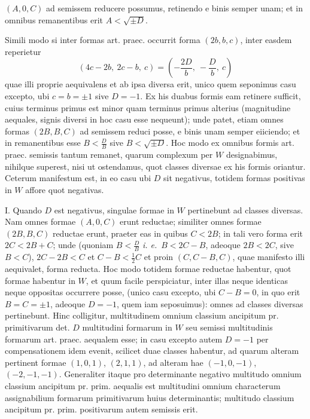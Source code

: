 $(A,0,C)$ ad semissem reducere possumus, retinendo e binis semper unam; et in
omnibus remanentibus erit $A<\sqrt{\pm D}$.

Simili modo si inter formas art. praec. occurrit forma $(2b,b,c)$, inter easdem reperietur
\[
(4c-2b,\ 2c-b,\ c)=\left(-\frac{2D}{b},\ -\frac{D}{b},\ c\right)
\]
quae illi proprie aequivalens et ab ipsa diversa erit, unico quem seponimus casu
excepto, ubi $c=b=\pm1$ sive $D=-1$. Ex his duabus formis eam retinere
sufficit, cuius terminus primus est minor quam terminus primus alterius (magnitudine
aequales, signis diversi in hoc casu esse nequeunt); unde patet, etiam
omnes formas $(2B,B,C)$ ad semissem reduci posse, e binis unam semper eiiciendo;
et in remanentibus esse $B<\frac{D}{B}$ sive $B<\sqrt{\pm D}$. Hoc modo ex omnibus
formis art. praec. semissis tantum remanet, quarum complexum per $W$ designabimus,
nihilque superest, nisi ut ostendamus, quot classes diversae ex his
formis oriantur. Ceterum manifestum est, in eo casu ubi $D$ sit negativus, totidem
formas positivas in $W$ affore quot negativas.

I. Quando $D$ est negativus, singulae formae in $W$ pertinebunt ad classes
diversas. Nam omnes formae $(A,0,C)$ erunt reductae; similiter omnes formae
$(2B,B,C)$ reductae erunt, praeter eas in quibus $C<2B$; in tali vero forma
erit $2C<2B+C$; unde (quoniam $B<\frac{D}{B}$ \textit{i. e.}\ $B<2C-B$, adeoque $2B<2C$,
sive $B<C$), $2C-2B<C$ et $C-B<\frac12 C$ et proin $(C,C-B,C)$, quae
manifesto illi aequivalet, forma reducta. Hoc modo totidem formae reductae
habentur, quot formae habentur in $W$, et quum facile perspiciatur, inter illas
neque identicas neque oppositas occurrere posse, (unico casu excepto, ubi
$C-B=0$, in quo erit $B=C=\pm1$, adeoque $D=-1$, quem iam seposuimus):
omnes ad classes diversas pertinebunt. Hinc colligitur, multitudinem
omnium classium ancipitum pr. primitivarum det. $D$ multitudini formarum in
$W$ seu semissi multitudinis formarum art. praec. aequalem esse; in casu excepto
autem $D=-1$ per compensationem idem evenit, scilicet duae classes
habentur, ad quarum alteram pertinent formae $(1,0,1)$, $(2,1,1)$, ad alteram hae
$(-1,0,-1)$, $(-2,-1,-1)$. Generaliter itaque pro determinante negativo
multitudo omnium classium ancipitum pr. prim. aequalis est multitudini omnium
characterum assignabilium formarum primitivarum huius determinantis; multitudo
classium ancipitum pr. prim. positivarum autem semissis erit.

